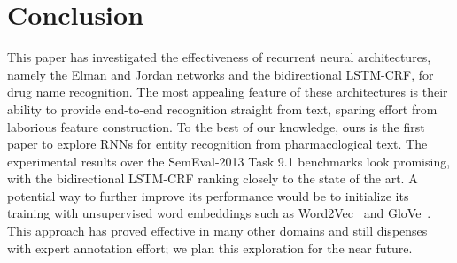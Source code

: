 \section{Conclusion}
\label{sec:conclusion}
This paper has investigated the effectiveness of recurrent neural architectures, namely the Elman and Jordan networks and the bidirectional LSTM-CRF, for drug name recognition. The most appealing feature of these architectures is their ability to provide end-to-end recognition straight from text, sparing effort from laborious feature construction. To the best of our knowledge, ours is the first paper to explore RNNs for entity recognition from pharmacological text. The experimental results over the SemEval-2013 Task 9.1 benchmarks look promising, with the bidirectional LSTM-CRF ranking closely to the state of the art. A potential way to  further improve its performance would be to initialize its training with unsupervised word embeddings such as Word2Vec~\cite{Mikolov:13} and GloVe~\cite{Pennington:14}. This approach has proved effective in many other domains and still dispenses with expert annotation effort; we plan this exploration for the near future.




